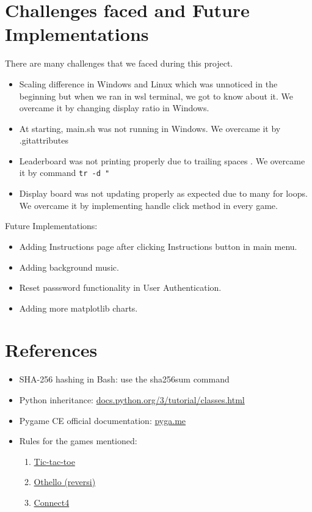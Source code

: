 \documentclass[12pt, letterpaper]{article}
\begin{document}
\section{Challenges faced and Future Implementations}
There are many challenges that we faced during this project.

\begin{itemize}
    \item Scaling difference in Windows and Linux which was unnoticed in the beginning but when we ran in wsl terminal, we got to know about it. We overcame it by changing display ratio in Windows.
    \item At starting, main.sh was not running in Windows. We overcame it by .gitattributes
    \item Leaderboard was not printing properly due to trailing spaces . We overcame it by command \texttt{tr -d "}
    \item Display board was not updating properly as expected due to many for loops. We overcame it by implementing handle click method in every game.
\end{itemize}

Future Implementations:

\begin{itemize}
    \item Adding Instructions page after clicking Instructions button in main menu.
    \item Adding background music.
    \item Reset passsword functionality in User Authentication.
    \item Adding more matplotlib charts.
\end{itemize}

\section{References}
\begin{itemize}

\item SHA-256 hashing in Bash: use the sha256sum command
\item Python inheritance: \href{https://docs.python.org/3/tutorial/classes.html}{docs.python.org/3/tutorial/classes.html}
\item Pygame CE official documentation: \href{https://pyga.me}{pyga.me}
\item Rules for the games mentioned:
\begin{enumerate}
    \item \href{https://tttxo.com/}{Tic-tac-toe}
    \item \href{https://www.mathsisfun.com/games/reversi.html}{Othello (reversi)}
    \item \href{https://www.mathsisfun.com/games/connect4.html}{Connect4}
\end{enumerate}

\end{itemize}
\end{document}

